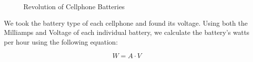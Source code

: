 \documentclass{article}
\begin{document}
\begin{figure}
  \caption{Revolution of Cellphone Batteries}
  \label{2}
\end{figure}

We took the battery type of each cellphone and found its voltage. Using both the Milliamps and Voltage of each individual battery, we calculate the battery's watts per hour using the following equation: \par
$$ W = A \cdot V $$ 
\end{document}
